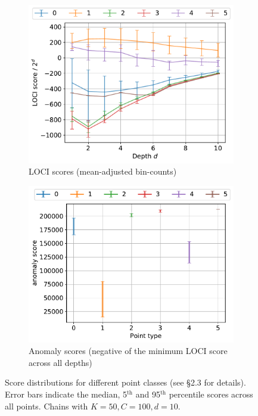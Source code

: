 \documentclass[11pt,onecolumn]{article}
\begin{document}
\begin{figure}[ht!]
\begin{subfigure}[t]{0.48\textwidth}
        \centering
        \includegraphics[width=\linewidth]{fig/chains_type_lociscores_k50c50d10.pdf}
        \caption{LOCI scores (mean-adjusted bin-counts)}
    \end{subfigure}
		\hfill
    \begin{subfigure}[t]{0.48\textwidth}
        \centering
        \includegraphics[width=\linewidth]{fig/chains_type_anomscores_k50c50d10.pdf}
        \caption{Anomaly scores (negative of the minimum LOCI score across all depths)}
    \end{subfigure}
    \caption{Score distributions for different point classes (see \S2.3 for details). Error bars indicate the median, 5$^{\textrm{th}}$ and 95$^{\textrm{th}}$ percentile scores across all points. Chains with $K=50, C=100, d=10$.}
\end{figure}
\end{document}
